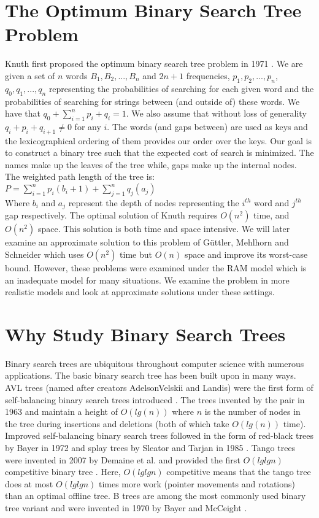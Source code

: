 \documentclass[letterpaper,12pt,titlepage,oneside,final]{book}
\theoremstyle{plain}
\begin{document}
\section{The Optimum Binary Search Tree Problem}

Knuth first proposed the optimum binary search tree problem in 1971 \cite{knuth1971optimum}. We are given a set of $n$ words $B_1, B_2, ..., B_n$ and $2n+1$ frequencies, ${p_1, p_2, ..., p_n}$, ${q_0, q_1, ..., q_n}$ representing the probabilities of searching for each given word and the probabilities of searching for strings between (and outside of) these words. We have that $ q_0 + \sum\limits_{i=1}^n p_i+q_i = 1$. We also assume that without loss of generality $q_i+p_i+q_{i+1} \neq 0$ for any $i$. The words (and gaps between) are used as keys and the lexicographical ordering of them provides our order over the keys. Our goal is to construct a binary tree such that the expected cost of search is minimized. The names make up the leaves of the tree while, gaps make up the internal nodes. The weighted path length of the tree is: \\
$P = \sum_{i=1}^{n} p_i(b_i+1) + \sum_{j=1}^{n} q_j(a_j)$ \\
Where $b_i$ and $a_j$ represent the depth of nodes representing the $i^{th}$ word and $j^{th}$ gap respectively. The optimal solution of Knuth requires $O(n^2)$ time, and $O(n^2)$ space. This solution is both time and space intensive. We will later examine an approximate solution  to this problem of G{\"u}ttler, Mehlhorn and Schneider which uses $O(n^2)$ time but $O(n)$ space and improve its worst-case bound. However, these problems were examined under the RAM model which is an inadequate model for many situations. We examine the problem in more realistic models and look at approximate solutions under these settings.

\section{Why Study Binary Search Trees}

Binary search trees are ubiquitous throughout computer science with numerous applications. The basic binary search tree has been built upon in many ways. AVL trees (named after creators AdelsonVelskii and Landis) were the first form of self-balancing binary search trees introduced \cite{adelsonvelskii1963algorithm}. The trees invented by the pair in 1963 and maintain a height of $O(lg(n))$ where $n$ is the number of nodes in the tree during insertions and deletions (both of which take $O(lg(n))$ time). Improved self-balancing binary search trees followed in the form of red-black trees by Bayer in 1972 and splay trees by Sleator and Tarjan in 1985 \cite{bayer1972symmetric} \cite{sleator1985self}. Tango trees were invented in 2007 by Demaine et al. and provided the first $O(lg lg n)$ competitive binary tree \cite{demaine2007dynamic}. Here, $O(lg lg n)$ competitive means that the tango tree does at most $O(lg lg n)$ times more work (pointer movements and rotations) than an optimal offline tree. B trees are among the most commonly used binary tree variant and were invented in 1970 by Bayer and McCeight \cite{bayer1970organization}. 
\end{document}
